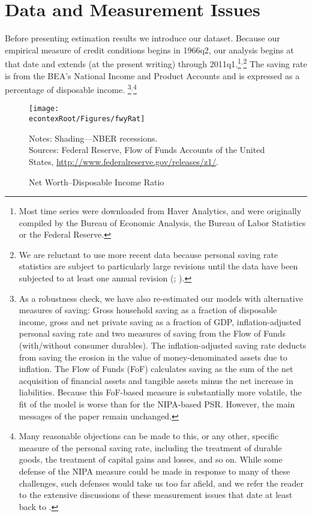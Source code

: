 \documentclass[titlepage]{\econtex}
\begin{document}
\section{Data and Measurement Issues} \label{DataAndMeasurement}

Before presenting estimation results we introduce our dataset.  Because our empirical measure of credit conditions begins in 1966q2, our analysis begins at that date and extends (at the present writing) through 2011q1.\footnote{Most time series were downloaded from Haver
  Analytics, and were originally compiled by the Bureau of Economic
  Analysis, the Bureau of Labor Statistics or the Federal Reserve.}$^{,}$\footnote{We are reluctant to use more recent data because personal saving rate statistics are subject to particularly large revisions until the data have been subjected to at least one annual revision (\cite{consumerGEP}; \cite{nsSavingRevisions}).} The saving rate is from the BEA's National Income and Product Accounts and is expressed as a percentage of disposable income.%
\footnote{  As a robustness check, we have also re-estimated our models with
  alternative measures of saving: Gross household saving as a fraction of disposable income, gross and net private saving as a fraction of GDP, inflation-adjusted personal saving rate and two measures of saving from the Flow of Funds (with/without consumer durables). The inflation-adjusted saving rate deducts from saving the erosion in the value of money-denominated assets due to inflation. The Flow of Funds (FoF) calculates saving as the sum of the net acquisition of financial assets and
  tangible assets minus the net increase in liabilities. Because this
  FoF-based measure is substantially more volatile, the fit of the
  model is worse than for the NIPA-based PSR. However, the main
  messages of the paper remain unchanged.  }$^{,}$\footnote{Many reasonable objections
can be made to this, or any other, specific measure of the personal saving rate, including
the treatment of durable goods, the treatment of capital gains and losses, and so on.  While
some defense of the NIPA measure could be made in response to many of these challenges, such
defenses would take us too far afield, and we refer the reader to the extensive discussions
of these measurement issues that date at least back to \cite{friedmanATheory}.}


\hypertarget{fwyRat}{}
\begin{figure}
\caption{Net Worth--Disposable Income Ratio}
\label{fwyRat}
\texttt{[image: \\econtexRoot/Figures/fwyRat]}


\footnotesize
Notes: Shading---NBER recessions.\\[0mm]
\tiny Sources: Federal Reserve, Flow of Funds Accounts of the United States, \url{http://www.federalreserve.gov/releases/z1/}.
\end{figure}
\end{document}
